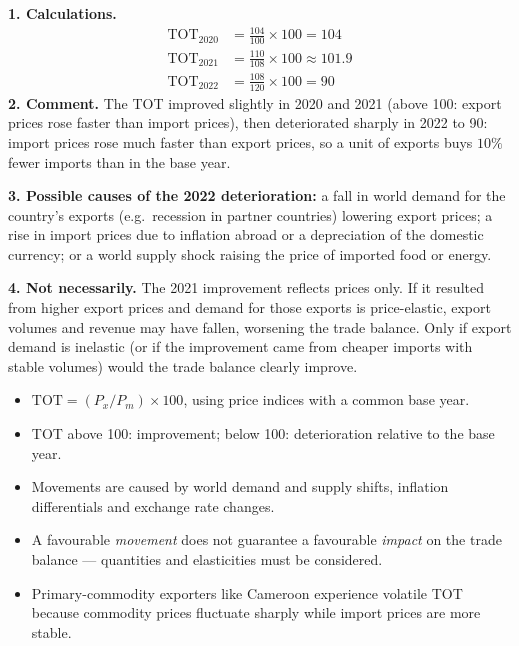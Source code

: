 \documentclass[11pt]{article}
\begin{document}
\begin{corrige}
\textbf{1. Calculations.}
\begin{align*}
\text{TOT}_{2020} &= \frac{104}{100}\times 100 = 104 \\
\text{TOT}_{2021} &= \frac{110}{108}\times 100 \approx 101.9 \\
\text{TOT}_{2022} &= \frac{108}{120}\times 100 = 90
\end{align*}
\textbf{2. Comment.} The TOT improved slightly in 2020 and 2021 (above 100: export prices rose faster than import prices), then deteriorated sharply in 2022 to 90: import prices rose much faster than export prices, so a unit of exports buys $10\%$ fewer imports than in the base year.\par
\textbf{3. Possible causes of the 2022 deterioration:} a fall in world demand for the country's exports (e.g.\ recession in partner countries) lowering export prices; a rise in import prices due to inflation abroad or a depreciation of the domestic currency; or a world supply shock raising the price of imported food or energy.\par
\textbf{4. Not necessarily.} The 2021 improvement reflects prices only. If it resulted from higher export prices and demand for those exports is price-elastic, export volumes and revenue may have fallen, worsening the trade balance. Only if export demand is inelastic (or if the improvement came from cheaper imports with stable volumes) would the trade balance clearly improve.
\end{corrige}

\begin{aretenir}
\begin{itemize}
\item $\text{TOT} = (P_x/P_m)\times 100$, using price indices with a common base year.
\item TOT above 100: improvement; below 100: deterioration relative to the base year.
\item Movements are caused by world demand and supply shifts, inflation differentials and exchange rate changes.
\item A favourable \emph{movement} does not guarantee a favourable \emph{impact} on the trade balance --- quantities and elasticities must be considered.
\item Primary-commodity exporters like Cameroon experience volatile TOT because commodity prices fluctuate sharply while import prices are more stable.
\end{itemize}
\end{aretenir}
\end{document}
